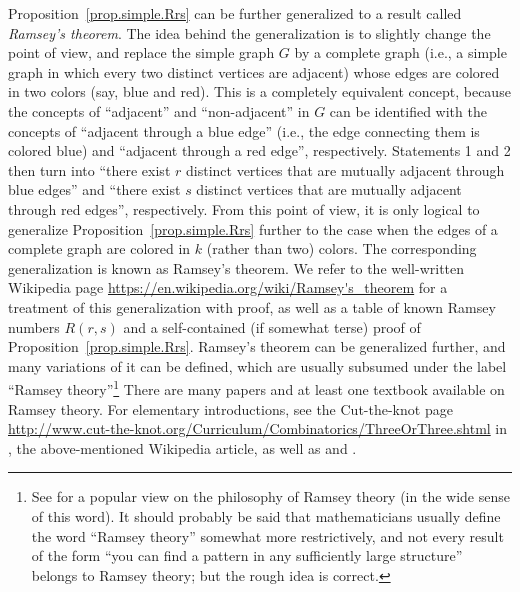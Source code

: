 \documentclass[numbers=enddot,12pt,final,onecolumn,notitlepage]{scrartcl}%
\theoremstyle{definition}
\newcommand{\tup}[1]{\left( #1 \right)}
\begin{document}
Proposition~\ref{prop.simple.Rrs} can be further generalized to a
result called \textit{Ramsey's theorem}. The idea behind the
generalization is to slightly change the point of view, and replace
the simple graph $G$ by a complete graph (i.e., a simple graph in
which every two distinct vertices are adjacent) whose edges are
colored in two colors (say, blue and red). This is a completely
equivalent concept, because the concepts of ``adjacent'' and
``non-adjacent'' in $G$ can be identified with the concepts of
``adjacent through a blue edge'' (i.e., the edge connecting them is
colored blue) and ``adjacent through a red edge'', respectively.
Statements 1 and 2 then turn into ``there exist $r$ distinct vertices
that are mutually adjacent through blue edges'' and ``there exist $s$
distinct vertices that are mutually adjacent through red edges'',
respectively. From this point of view, it is only logical to
generalize Proposition~\ref{prop.simple.Rrs} further to the case when
the edges of a complete graph are colored in $k$ (rather than two)
colors. The corresponding generalization is known as Ramsey's theorem.
We refer to the well-written Wikipedia page
\url{https://en.wikipedia.org/wiki/Ramsey's_theorem} for a treatment
of this generalization with proof, as well as a table of known Ramsey
numbers $R\tup{r,s}$ and a self-contained (if somewhat terse) proof of
Proposition~\ref{prop.simple.Rrs}. Ramsey's theorem can be generalized
further, and many variations of it can be defined, which are usually
subsumed under the label ``Ramsey theory''\footnote{See
\cite{RaWi-Ramsey} for a popular view on the philosophy of Ramsey
theory (in the wide sense of this word). It should probably be said
that mathematicians usually define the word ``Ramsey theory'' somewhat
more restrictively, and not every result of the form ``you can find a
pattern in any sufficiently large structure'' belongs to Ramsey
theory; but the rough idea is correct.} There are many papers and at
least one textbook \cite{GrRoSp90} available on Ramsey theory. For
elementary introductions, see the Cut-the-knot page
\url{http://www.cut-the-knot.org/Curriculum/Combinatorics/ThreeOrThree.shtml}
in \cite{cut-the-knot}, the above-mentioned Wikipedia article, as well
as \cite[Chapter VI]{Bollob79} and \cite[Section 8.3]{West01}.
\end{document}
